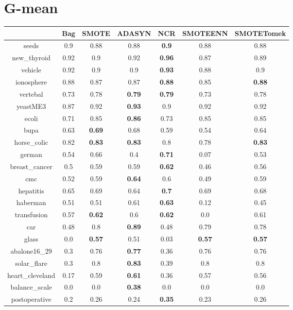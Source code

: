 \documentclass{article}%
\begin{document}
\section*{G{-}mean}%
\begin{tabular}{c|cccccc}%
&Bag&SMOTE&ADASYN&NCR&SMOTEENN&SMOTETomek\\%
\hline%
seeds&0.9&0.88&0.88&\textbf{0.9}&0.88&0.88\\%
new\_thyroid&0.92&0.9&0.92&\textbf{0.96}&0.87&0.89\\%
vehicle&0.92&0.9&0.9&\textbf{0.93}&0.88&0.9\\%
ionosphere&0.88&0.87&0.87&\textbf{0.88}&0.85&\textbf{0.88}\\%
vertebal&0.73&0.78&\textbf{0.79}&\textbf{0.79}&0.73&0.78\\%
yeastME3&0.87&0.92&\textbf{0.93}&0.9&0.92&0.92\\%
ecoli&0.71&0.85&\textbf{0.86}&0.73&0.85&0.85\\%
bupa&0.63&\textbf{0.69}&0.68&0.59&0.54&0.64\\%
horse\_colic&0.82&\textbf{0.83}&\textbf{0.83}&0.8&0.78&\textbf{0.83}\\%
german&0.54&0.66&0.4&\textbf{0.71}&0.07&0.53\\%
breast\_cancer&0.5&0.59&0.59&\textbf{0.62}&0.46&0.56\\%
cmc&0.52&0.59&\textbf{0.64}&0.6&0.49&0.59\\%
hepatitis&0.65&0.69&0.64&\textbf{0.7}&0.69&0.68\\%
haberman&0.51&0.51&0.61&\textbf{0.63}&0.12&0.45\\%
transfusion&0.57&\textbf{0.62}&0.6&\textbf{0.62}&0.0&0.61\\%
car&0.48&0.8&\textbf{0.89}&0.48&0.79&0.78\\%
glass&0.0&\textbf{0.57}&0.51&0.03&\textbf{0.57}&\textbf{0.57}\\%
abalone16\_29&0.3&0.76&\textbf{0.77}&0.36&0.76&0.76\\%
solar\_flare&0.3&0.8&\textbf{0.83}&0.39&0.8&0.8\\%
heart\_cleveland&0.17&0.59&\textbf{0.61}&0.36&0.57&0.56\\%
balance\_scale&0.0&0.0&\textbf{0.38}&0.0&0.0&0.0\\%
postoperative&0.2&0.26&0.24&\textbf{0.35}&0.23&0.26\\%
\end{tabular}

%
\end{document}
